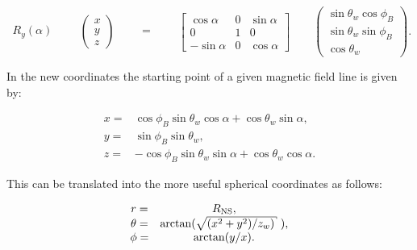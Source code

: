 \begin{equation}
\begin{array}{c}
             \\
R_{y}(\alpha)\\
              \end{array} 
\qquad
\left( \begin{array}{c}
x  \\
y  \\
z  \end{array} \right)
\qquad
\begin{array}{c}
   \\
=  \\
   \end{array}
\qquad
\left[ \begin{array}{ccc}
\cos \alpha  & 0 & \sin \alpha  \\
0            & 1 & 0            \\
-\sin \alpha & 0 & \cos \alpha  \end{array} \right]
\qquad
\left( \begin{array}{c}
\sin \theta_w \cos \phi_B  \\
\sin \theta_w \sin \phi_B  \\
\cos \theta_w  \end{array} \right)
.\end{equation}

In the new coordinates the starting point of a given magnetic field line is given by:

\begin{equation}
\begin{array}{cc}
x= &  \cos\phi_B \sin\theta_w \cos\alpha + \cos\theta_w \sin\alpha, \\
y= &  \sin\phi_B \sin\theta_w, \\
z= & -\cos\phi_B \sin\theta_w \sin\alpha +  \cos\theta_w \cos\alpha. 
\end{array}
\end{equation}

This can be translated into the more useful spherical coordinates as follows:

\begin{equation}
\begin{array}{cc}
r=      & R_{\rm{NS}}, \\
\theta= & \arctan(\sqrt{(x^2+y^2)/z_w)}\textrm{ }), \\
\phi=   & \arctan(y/x). \\ 
\end{array} 
\end{equation}


